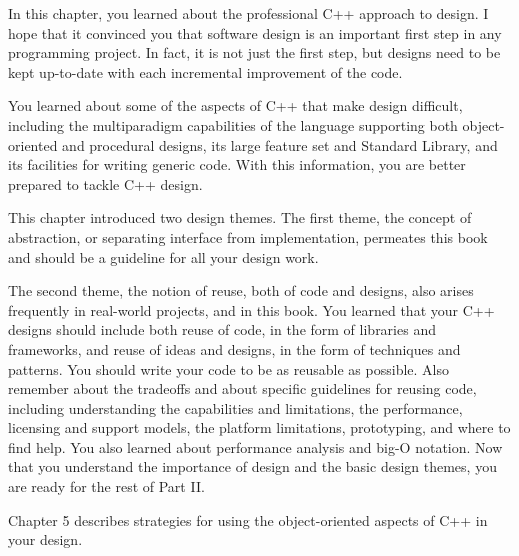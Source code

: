 In this chapter, you learned about the professional C++ approach to design. I hope that it convinced you that software design is an important first step in any programming project. In fact, it is not just the first step, but designs need to be kept up-to-date with each incremental improvement of the code.

You learned about some of the aspects of C++ that make design difficult, including the multiparadigm capabilities of the language supporting both object-oriented and procedural designs, its large feature set and Standard Library, and its facilities for writing generic code. With this information, you are better prepared to tackle C++ design.

This chapter introduced two design themes. The first theme, the concept of abstraction, or separating interface from implementation, permeates this book and should be a guideline for all your design work.

The second theme, the notion of reuse, both of code and designs, also arises frequently in real-world projects, and in this book. You learned that your C++ designs should include both reuse of code, in the form of libraries and frameworks, and reuse of ideas and designs, in the form of techniques and patterns. You should write your code to be as reusable as possible. Also remember about the tradeoffs and about specific guidelines for reusing code, including understanding the capabilities and limitations, the performance, licensing and support models, the platform limitations, prototyping, and where to find help. You also learned about performance analysis and big-O notation. Now that you understand the importance of design and the basic design themes, you are ready for the rest of Part II.

Chapter 5 describes strategies for using the object-oriented aspects of C++ in your design.